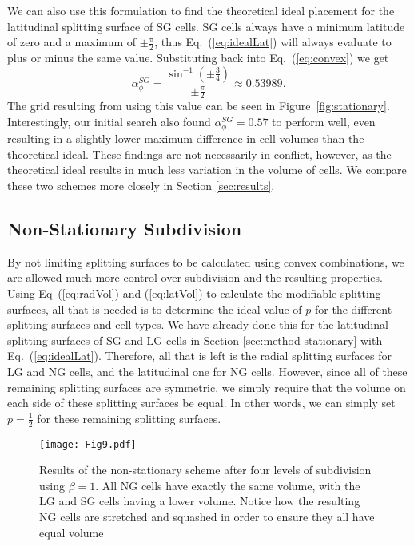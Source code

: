 We can also use this formulation to find the theoretical ideal placement for the latitudinal splitting surface of SG cells.
SG cells always have a minimum latitude of zero and a maximum of $\pm \frac{\pi}{2}$, thus Eq.~(\ref{eq:idealLat}) will always evaluate to plus or minus the same value.
Substituting back into Eq.~(\ref{eq:convex}) we get
%
\begin{equation} \label{eq:latValue}
\alpha_{\phi}^{SG} = \frac{ \sin^{-1} \left( \pm \frac{3}{4} \right) }{ \pm \frac{\pi}{2} } \approx 0.53989.
\end{equation}
%
The grid resulting from using this value can be seen in Figure~\ref{fig:stationary}.
Interestingly, our initial search also found $\alpha_{\phi}^{SG} = 0.57$ to perform well, even resulting in a slightly lower maximum difference in cell volumes than the theoretical ideal.
These findings are not necessarily in conflict, however, as the theoretical ideal results in much less variation in the volume of cells.
We compare these two schemes more closely in Section \ref{sec:results}.


\subsection{Non-Stationary Subdivision} \label{sec:method-nonStationary}
By not limiting splitting surfaces to be calculated using convex combinations, we are allowed much more control over subdivision and the resulting properties.
Using Eq~(\ref{eq:radVol}) and (\ref{eq:latVol}) to calculate the modifiable splitting surfaces, all that is needed is to determine the ideal value of $p$ for the different splitting surfaces and cell types.
We have already done this for the latitudinal splitting surfaces of SG and LG cells in Section \ref{sec:method-stationary} with Eq.~(\ref{eq:idealLat}).
Therefore, all that is left is the radial splitting surfaces for LG and NG cells, and the latitudinal one for NG cells.
However, since all of these remaining splitting surfaces are symmetric, we simply require that the volume on each side of these splitting surfaces be equal.
In other words, we can simply set $p = \frac{1}{2}$ for these remaining splitting surfaces.


\begin{figure}[tbp]
	\texttt{[image: Fig9.pdf]}
	\caption{Results of the non-stationary scheme after four levels of subdivision using $\beta = 1$.
		All NG cells have exactly the same volume, with the LG and SG cells having a lower volume.
		Notice how the resulting NG cells are stretched and squashed in order to ensure they all have equal volume}
	\label{fig:perfect}
\end{figure}


